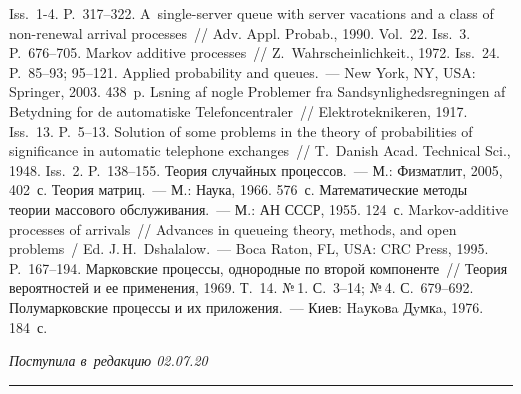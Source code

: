 {\begin{multicols}{2}
{{\begin{thebibliography}{99}
Iss.~1-4. P.~317--322.
 A~single-server queue with server 
vacations and a class of non-renewal arrival processes~// Adv. Appl. Probab., 1990. 
Vol.~22. Iss.~3. P.~676--705.
 Markov additive processes~// 
Z.~Wahrscheinlichkeit., 1972. Iss.~24. P.~85--93; 95--121. 
 Applied probability and queues.~--- New York, NY, USA: Springer, 2003. 
438~p.
 \mbox{L{\!\ptb{\o}}sning} af nogle Problemer fra Sandsynlighedsregningen af 
Betydning for de automatiske Telefoncentraler~// Elektroteknikeren, 1917. Iss.~13. P.~5--13.
 Solution of some problems in the theory of probabilities of significance in 
automatic telephone exchanges~// T.~Danish Acad. Technical Sci., 
1948. Iss.~2. P.~138--155. 
 Теория случайных процессов.~--- М.:  Физматлит, 2005, 
402~с.
 Теория матриц.~--- М.: Наука, 1966. 576~с.
 Математические методы теории массового обслуживания.~--- М.: АН 
СССР, 1955. 124~с.
 Markov-additive processes of arrivals~// Advances in queueing 
theory, methods, and open problems~/ Ed. J.\,H.~Dshalalow.~--- Boca Raton, FL,
USA: CRC Press, 
1995. P.~167--194.
 Марковские процессы, однородные по второй 
компоненте~// Теория вероятностей и ее применения, 1969. Т.~14. №\,1. С.~3--14;  
№\,4. С.~679--692.
 Полумарковские процессы и их приложения.~--- Киев: 
Haукoвa Дyмкa, 1976. 184~с.
\end{thebibliography}

 }
 }

\end{multicols}

\vspace*{-6pt}

\hfill{\small\textit{Поступила в~редакцию 02.07.20}}

\vspace*{8pt}




\hrule

\vspace*{2pt}

}
